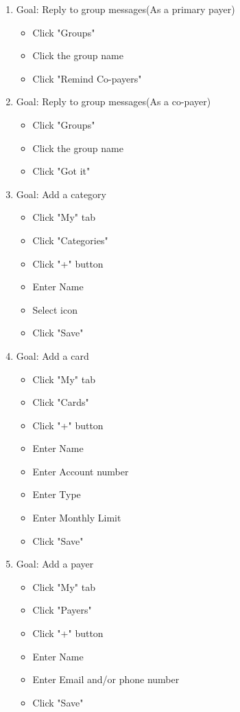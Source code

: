 \documentclass{sigchi}
\begin{document}
\begin{enumerate}
\item Goal: Reply to group messages(As a primary payer)
    \begin{itemize}
        \item Click "Groups"
        \item Click the group name
        \item Click "Remind Co-payers"
    \end{itemize}
    
\item Goal: Reply to group messages(As a co-payer)
    \begin{itemize}
        \item Click "Groups"
        \item Click the group name
        \item Click "Got it"
    \end{itemize}
    

\item Goal: Add a category
    \begin{itemize}
        \item Click "My" tab
        \item Click "Categories"
        \item Click "+" button
        \item Enter Name
        \item Select icon
        \item Click "Save"
    \end{itemize}
    
\item Goal: Add a card
    \begin{itemize}
        \item Click "My" tab
        \item Click "Cards"
        \item Click "+" button
        \item Enter Name
        \item Enter Account number
        \item Enter Type
        \item Enter Monthly Limit
        \item Click "Save"
    \end{itemize}
    
\item Goal: Add a payer
    \begin{itemize}
        \item Click "My" tab
        \item Click "Payers"
        \item Click "+" button
        \item Enter Name
        \item Enter Email and/or phone number
        \item Click "Save"
    \end{itemize}


\end{enumerate}
\end{document}
